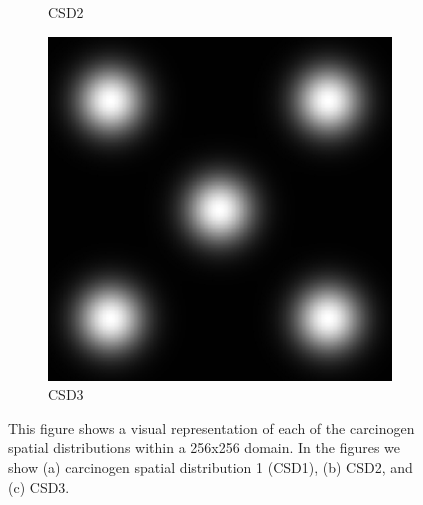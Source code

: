 \documentclass[\main/thesis.tex]{subfiles}
\begin{document}
\begin{figure}[H]
\begin{subfigure}[t]{.25\textwidth}
      \caption{CSD2}
      \label{fig:CarcinFunc_Func2Distribution}
    \end{subfigure}
    \begin{subfigure}[t]{.25\textwidth}
      \centering
      \includegraphics[width=\textwidth]{images/4_CarcinFunc/Fig1/Func3.jpeg}
      \caption{CSD3}
      \label{fig:CarcinFunc_Func3Distribution}
    \end{subfigure}
    \caption{This figure shows a visual representation of each of the carcinogen spatial distributions within a 256x256 domain. In the figures we show (a) carcinogen spatial distribution 1 (CSD1), (b) CSD2, and (c) CSD3.}
    \label{fig:CarcinFunc_FunctionDistributions}
\end{figure}
\end{document}
